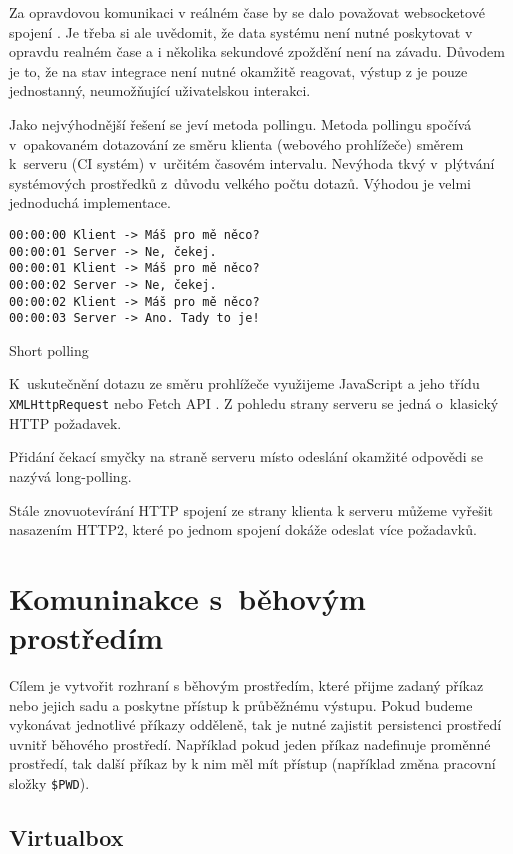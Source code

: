 Za opravdovou komunikaci v reálném čase by se dalo považovat websocketové spojení \cite{websocket}.
Je třeba si ale uvědomit, že data systému není nutné poskytovat v opravdu realném čase a i několika sekundové zpoždění není na závadu.
Důvodem je to, že na stav integrace není nutné okamžitě reagovat, výstup z  je pouze jednostanný, neumožňující uživatelskou interakci.

Jako nejvýhodnější řešení se jeví metoda pollingu.
Metoda pollingu spočívá v~opakovaném dotazování ze směru klienta (webového prohlížeče) směrem k~serveru (CI systém) v~určitém časovém intervalu.
Nevýhoda tkvý v~plýtvání systémových prostředků z~důvodu velkého počtu dotazů.
Výhodou je velmi jednoduchá implementace.

\begin{listing}[ht]
\begin{verbatim}
00:00:00 Klient -> Máš pro mě něco?
00:00:01 Server -> Ne, čekej.
00:00:01 Klient -> Máš pro mě něco?
00:00:02 Server -> Ne, čekej.
00:00:02 Klient -> Máš pro mě něco?
00:00:03 Server -> Ano. Tady to je!
\end{verbatim}
\caption{Short polling}
\end{listing}

K~uskutečnění dotazu ze směru prohlížeče využijeme JavaScript a jeho třídu \verb|XMLHttpRequest| nebo Fetch API \cite{fetch_api}.
Z pohledu strany serveru se jedná o~klasický HTTP požadavek.

Přidání čekací smyčky na straně serveru místo odeslání okamžité odpovědi se nazývá long-polling.

Stále znovuotevírání HTTP spojení ze strany klienta k serveru můžeme vyřešit nasazením HTTP2, které po jednom spojení dokáže odeslat více požadavků.

\section{Komuninakce s~běhovým prostředím}

Cílem je vytvořit rozhraní s běhovým prostředím, které přijme zadaný příkaz nebo jejich sadu a poskytne přístup k průběžnému výstupu.
Pokud budeme vykonávat jednotlivé příkazy odděleně, tak je nutné zajistit persistenci prostředí uvnitř běhového prostředí.
Například pokud jeden příkaz nadefinuje proměnné prostředí, tak další příkaz by k nim měl mít přístup (například změna pracovní složky \verb|$PWD|).

\subsection{Virtualbox}

